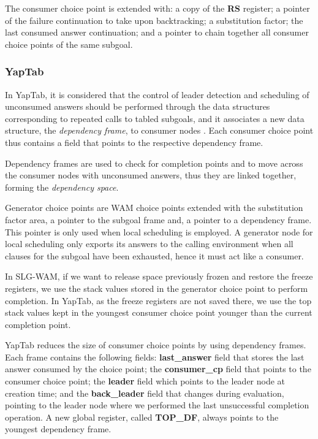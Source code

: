   The consumer choice point is extended with: a copy of the \textbf{RS} register; a pointer of the failure continuation to take
  upon backtracking; a substitution factor; the last consumed answer continuation; and a pointer to chain
  together all consumer choice points of the same subgoal. 

  \subsubsection{YapTab}

  In YapTab, it is considered that the control of leader detection and scheduling of unconsumed answers should be
  performed through the data structures corresponding to repeated calls to tabled subgoals, and it associates a new
  data structure, the \textit{dependency frame}, to consumer nodes \cite{Rocha-00a}. Each consumer choice point thus
  contains a field that points to the respective dependency frame.

  Dependency frames are used to check for completion points and to move across the consumer nodes with unconsumed answers,
  thus they are linked together, forming the \textit{dependency space}.

  Generator choice points are WAM choice points extended with the substitution factor area, a pointer
  to the subgoal frame and, a pointer to a dependency frame. This pointer
  is only used when local scheduling is employed. A generator node for local scheduling only exports its answers to the calling
  environment when all clauses for the subgoal have been exhausted, hence it must act like a consumer.

  In SLG-WAM, if we want to release space previously frozen and restore the freeze registers, we use the
  stack values stored in the generator choice point to perform completion. In YapTab, as the freeze registers
  are not saved there, we use the top stack values kept in the youngest consumer choice point younger than the current completion point.

  YapTab reduces the size of consumer choice points by using dependency frames. Each frame contains the
  following fields: \textbf{last\_answer} field that stores the last answer consumed by the choice point;
  the \textbf{consumer\_cp} field that points to the consumer choice point; the \textbf{leader} field which
  points to the leader node at creation time; and the \textbf{back\_leader} field that changes during
  evaluation, pointing to the leader node where we performed the last unsuccessful completion operation.
  A new global register, called \textbf{TOP\_DF}, always points to the youngest dependency frame.

